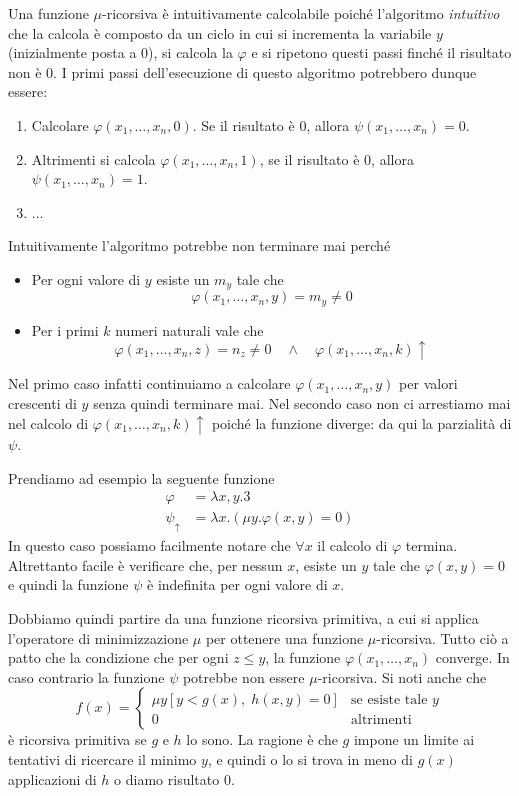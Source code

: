 Una funzione $\mu$-ricorsiva è intuitivamente calcolabile poiché
l'algoritmo \emph{intuitivo} che la calcola è composto da un
ciclo in cui si incrementa la variabile $y$ (inizialmente posta
a $0$), si calcola la $\varphi$ e si ripetono questi passi
finché il risultato non è $0$. I primi passi dell'esecuzione
di questo algoritmo potrebbero dunque essere:
\begin{enumerate}
	\item Calcolare $\varphi(x_1, \dots, x_n, 0)$. Se il
	      risultato è $0$, allora $\psi (x_1, \dots, x_n) = 0$.
	\item Altrimenti si calcola $\varphi(x_1, \dots, x_n, 1)$,
	      se il risultato è $0$, allora
	      $\psi(x_1, \dots, x_n)=1$.
	\item ...
\end{enumerate}
Intuitivamente l'algoritmo potrebbe non terminare mai perché
\begin{itemize}
	\item Per ogni valore di $y$ esiste un $m_y$ tale che
	      \[ \varphi (x_1, \dots, x_n, y) = m_y \neq 0 \]
	\item Per i primi $k$ numeri naturali vale che
	      \[
		      \varphi (x_1, \dots, x_n, z) = n_z \neq 0
		      \quad \land \quad
		      \varphi (x_1, \dots, x_n, k) \uparrow
	      \]
\end{itemize}
Nel primo caso infatti continuiamo a calcolare
$\varphi(x_1, \dots, x_n, y)$ per valori crescenti di $y$ senza
quindi terminare mai. Nel secondo caso non ci arrestiamo mai nel
calcolo di $\varphi (x_1, \dots, x_n, k) \uparrow$ poiché la
funzione diverge: da qui la parzialità di $\psi$.

\begin{example}
	Prendiamo ad esempio la seguente funzione
	\begin{align*}
		\varphi       & = \lambda x, y . 3 \\
		\psi_\uparrow & =
		\lambda x . (\mu y . \varphi(x, y) = 0)
	\end{align*}
	In questo caso possiamo facilmente notare che $\forall x$ il
	calcolo di $\varphi$ termina. Altrettanto facile è
	verificare che, per nessun $x$, esiste un $y$ tale che
	$\varphi (x, y) = 0$ e quindi la funzione $\psi$ è indefinita
	per ogni valore di $x$.
\end{example}

Dobbiamo quindi partire da una funzione ricorsiva primitiva, a
cui si applica l'operatore di minimizzazione $\mu$ per ottenere
una funzione $\mu$-ricorsiva. Tutto ciò a patto che la condizione
che per ogni $z \leq y$, la funzione $\varphi (x_1, \dots, x_n)$
converge. In caso contrario la funzione $\psi$ potrebbe non
essere $\mu$-ricorsiva. Si noti anche che
\[
	f(x) = \begin{cases}
		\mu y [y < g(x), \; h(x, y) = 0] &
		\text{se esiste tale } y                             \\
		0                                & \text{altrimenti}
	\end{cases}
\]
è ricorsiva primitiva se $g$ e $h$ lo sono. La ragione è che $g$
impone un limite ai tentativi di ricercare il minimo $y$, e
quindi o lo si trova in meno di $g(x)$ applicazioni di $h$ o
diamo risultato $0$.

